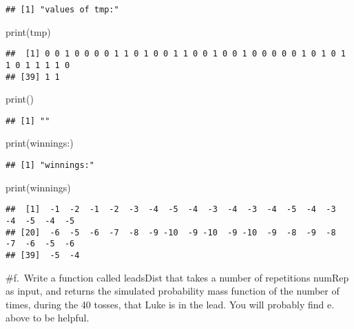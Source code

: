\documentclass[
]{article}
\newenvironment{Shaded}{\begin{snugshade}}{\end{snugshade}}
\newcommand{\FunctionTok}[1]{\textcolor[rgb]{0.00,0.00,0.00}{#1}}
\newcommand{\NormalTok}[1]{#1}
\newcommand{\StringTok}[1]{\textcolor[rgb]{0.31,0.60,0.02}{#1}}
\begin{document}
\begin{verbatim}
## [1] "values of tmp:"
\end{verbatim}

\begin{Shaded}
\begin{Highlighting}[]
\FunctionTok{print}\NormalTok{(tmp)}
\end{Highlighting}
\end{Shaded}

\begin{verbatim}
##  [1] 0 0 1 0 0 0 0 1 1 0 1 0 0 1 1 0 0 1 0 0 1 0 0 0 0 0 1 0 1 0 1 1 0 1 1 1 1 0
## [39] 1 1
\end{verbatim}

\begin{Shaded}
\begin{Highlighting}[]
\FunctionTok{print}\NormalTok{(}\StringTok{\textquotesingle{}\textquotesingle{}}\NormalTok{)}
\end{Highlighting}
\end{Shaded}

\begin{verbatim}
## [1] ""
\end{verbatim}

\begin{Shaded}
\begin{Highlighting}[]
\FunctionTok{print}\NormalTok{(}\StringTok{\textquotesingle{}winnings:\textquotesingle{}}\NormalTok{)}
\end{Highlighting}
\end{Shaded}

\begin{verbatim}
## [1] "winnings:"
\end{verbatim}

\begin{Shaded}
\begin{Highlighting}[]
\FunctionTok{print}\NormalTok{(winnings)}
\end{Highlighting}
\end{Shaded}

\begin{verbatim}
##  [1]  -1  -2  -1  -2  -3  -4  -5  -4  -3  -4  -3  -4  -5  -4  -3  -4  -5  -4  -5
## [20]  -6  -5  -6  -7  -8  -9 -10  -9 -10  -9 -10  -9  -8  -9  -8  -7  -6  -5  -6
## [39]  -5  -4
\end{verbatim}

\#f.~Write a function called leadsDist that takes a number of
repetitions numRep as input, and returns the simulated probability mass
function of the number of times, during the 40 tosses, that Luke is in
the lead. You will probably find e. above to be helpful.
\end{document}
